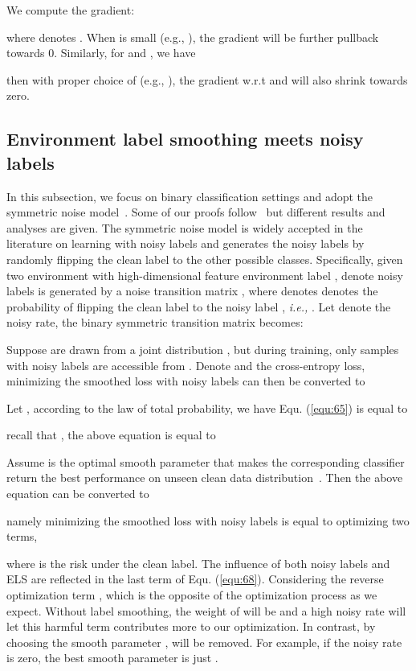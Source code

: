 \documentclass{article} \usepackage{iclr2023_conference,times}
\newcommand{\ls}[0]{ELS\xspace}
\newcommand{\myref}[1]{Equ. (\ref{#1})}
\newcommand{\ie}[0]{\textit{i.e., }}
\begin{document}
We compute the gradient:

where  denotes . When  is small (e.g., ), the gradient will be further pullback towards 0.
Similarly, for  and , we have

then with proper choice of  (e.g., ), the gradient w.r.t  and  will also shrink towards zero.



\subsection{Environment label smoothing meets noisy labels}\label{sec:noisy..............}

In this subsection, we focus on binary classification settings and adopt the symmetric noise model~\citep{kim2019nlnl}. Some of our proofs follow~\citep{wei2021smooth} but different results and analyses are given. The symmetric noise model is widely accepted in the literature on learning with noisy labels and generates the noisy labels by randomly flipping the clean label to the other possible classes. Specifically, given two environment with high-dimensional feature  environment label , denote noisy labels  is generated by a noise transition matrix , where  denotes denotes the probability of flipping the clean label  to the noisy label , \ie . Let  denote the noisy rate, the binary symmetric transition matrix becomes:

Suppose  are drawn from a joint distribution , but during training, only samples with noisy labels are accessible from . Denote  and  the cross-entropy loss, minimizing the smoothed loss with noisy labels can then be converted to

Let , according to the law of total probability, we have \myref{equ:65} is equal to


recall that , the above equation is equal to

Assume  is the optimal smooth parameter that makes the corresponding classifier return the best performance on unseen clean data distribution~\citep{wei2021smooth}. Then the above equation can be converted to


namely minimizing the smoothed loss with noisy labels is equal to optimizing two terms, 

where  is the risk under the clean label. The influence of both noisy labels and \ls are reflected in the last term of \myref{equ:68}. Considering the reverse optimization term , which is the opposite of the optimization process as we expect. Without label smoothing, the weight of  will be  and a high noisy rate  will let this harmful term contributes more to our optimization. In contrast, by choosing the smooth parameter ,  will be removed. For example, if the noisy rate is zero, the best smooth parameter is just .
\end{document}
